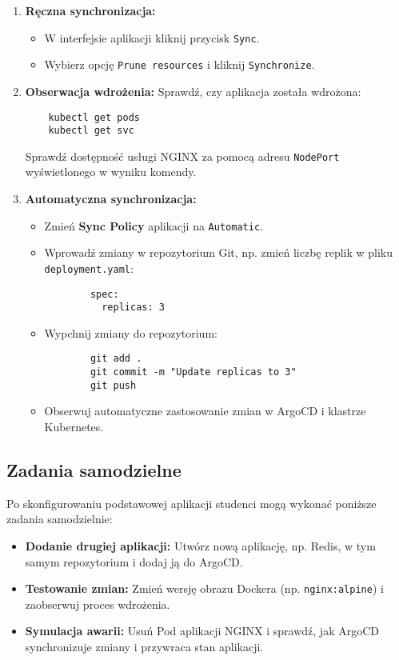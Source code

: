 \documentclass{article}
\begin{document}
\begin{enumerate}
    \item \textbf{Ręczna synchronizacja:}
    \begin{itemize}
        \item W interfejsie aplikacji kliknij przycisk \texttt{Sync}.
        \item Wybierz opcję \texttt{Prune resources} i kliknij \texttt{Synchronize}.
    \end{itemize}
    
    \item \textbf{Obserwacja wdrożenia:} Sprawdź, czy aplikacja została wdrożona:
    \begin{lstlisting}
    kubectl get pods
    kubectl get svc
    \end{lstlisting}
    Sprawdź dostępność usługi NGINX za pomocą adresu \texttt{NodePort} wyświetlonego w wyniku komendy.

    \item \textbf{Automatyczna synchronizacja:}
    \begin{itemize}
        \item Zmień \textbf{Sync Policy} aplikacji na \texttt{Automatic}.
        \item Wprowadź zmiany w repozytorium Git, np. zmień liczbę replik w pliku \texttt{deployment.yaml}:
        \begin{lstlisting}
        spec:
          replicas: 3
        \end{lstlisting}
        \item Wypchnij zmiany do repozytorium:
        \begin{lstlisting}
        git add .
        git commit -m "Update replicas to 3"
        git push
        \end{lstlisting}
        \item Obserwuj automatyczne zastosowanie zmian w ArgoCD i klastrze Kubernetes.
    \end{itemize}
\end{enumerate}

\subsection{Zadania samodzielne}

Po skonfigurowaniu podstawowej aplikacji studenci mogą wykonać poniższe zadania samodzielnie:

\begin{itemize}
    \item \textbf{Dodanie drugiej aplikacji:} Utwórz nową aplikację, np. Redis, w tym samym repozytorium i dodaj ją do ArgoCD.
    \item \textbf{Testowanie zmian:} Zmień wersję obrazu Dockera (np. \texttt{nginx:alpine}) i zaobserwuj proces wdrożenia.
    \item \textbf{Symulacja awarii:} Usuń Pod aplikacji NGINX i sprawdź, jak ArgoCD synchronizuje zmiany i przywraca stan aplikacji.
\end{itemize}
\end{document}
